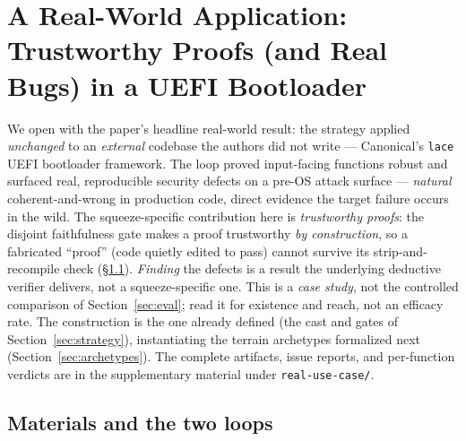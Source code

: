 \documentclass[11pt]{article}
\newcommand{\code}[1]{\texttt{#1}}
\begin{document}
\section{A Real-World Application: Trustworthy Proofs (and Real Bugs) in a UEFI Bootloader}
\label{sec:realworld}

We open with the paper's headline real-world result: the strategy applied \emph{unchanged} to an
\emph{external} codebase the authors did not write --- Canonical's \code{lace} UEFI bootloader
framework. The loop proved \ResRWRobust{} input-facing functions robust and surfaced
\ResRWBugsNum{} real, reproducible security defects on a pre-OS attack surface ---
\emph{natural} coherent-and-wrong in production code, direct evidence the target failure occurs in
the wild. The squeeze-specific contribution here is \emph{trustworthy proofs}: the disjoint
faithfulness gate makes a proof trustworthy \emph{by construction}, so a fabricated ``proof'' (code quietly
edited to pass) cannot survive its strip-and-recompile check (\S\ref{sec:realworld-loops}). \emph{Finding} the defects is a
result the underlying deductive verifier delivers, not a squeeze-specific one. This is a
\emph{case study}, not the controlled comparison of Section~\ref{sec:eval}; read it for existence
and reach, not an efficacy rate. The construction is the one already defined (the cast and gates of
Section~\ref{sec:strategy}), instantiating the terrain archetypes formalized next
(Section~\ref{sec:archetypes}). The complete artifacts, issue reports, and per-function verdicts
are in the supplementary material under \code{real-use-case/}.

\subsection{Materials and the two loops}
\label{sec:realworld-loops}
\end{document}
